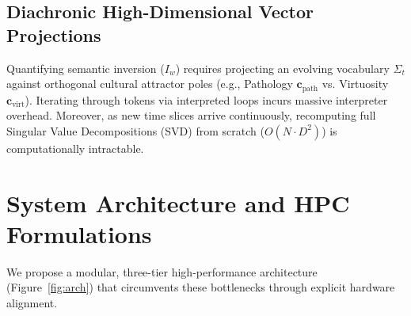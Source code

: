 \documentclass[11pt,a4paper]{article}
\begin{document}
\subsection{Diachronic High-Dimensional Vector Projections}
Quantifying semantic inversion ($I_w$) requires projecting an evolving vocabulary $\Sigma_t$ against orthogonal cultural attractor poles (e.g., Pathology $\mathbf{c}_{\text{path}}$ vs. Virtuosity $\mathbf{c}_{\text{virt}}$). Iterating through tokens via interpreted loops incurs massive interpreter overhead. Moreover, as new time slices arrive continuously, recomputing full Singular Value Decompositions (SVD) from scratch ($O(N \cdot D^2)$) is computationally intractable.

\section{System Architecture and HPC Formulations}

We propose a modular, three-tier high-performance architecture (Figure~\ref{fig:arch}) that circumvents these bottlenecks through explicit hardware alignment.
\end{document}
